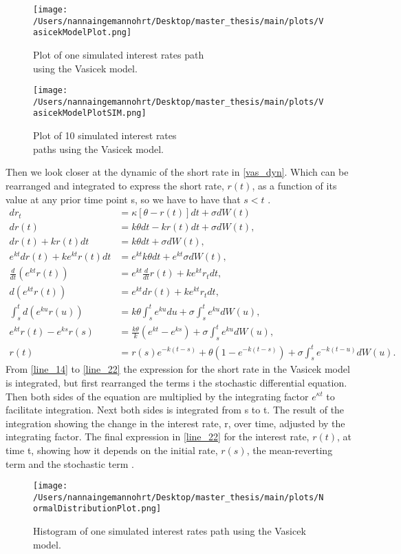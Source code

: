 \begin{figure}[h]
    \centering
    \begin{minipage}{0.5\textwidth}
        \texttt{[image: /Users/nannaingemannohrt/Desktop/master\_thesis/main/plots/VasicekModelPlot.png]}
        \caption{Plot of one simulated interest rates path \\ using the Vasicek model.}
        \label{fig:vasicek}
    \end{minipage}\hfill 
    \begin{minipage}{0.5\textwidth}
        \texttt{[image: /Users/nannaingemannohrt/Desktop/master\_thesis/main/plots/VasicekModelPlotSIM.png]}
        \caption{Plot of 10 simulated interest rates \\ paths using the Vasicek model.}
        \label{fig:vasicek-sim}
    \end{minipage}
\end{figure}

\noindent
\newpage
\noindent
Then we look closer at the dynamic of the short rate in \autoref{vas_dyn}. Which can be rearranged and integrated
to express the short rate, $r(t)$, as a function of its value at any prior time point s, 
so we have to have that $s < t$ \cite{Bermudan}. 
\begin{align}
    d r_t &= \kappa \left[\theta - r(t)\right] dt + \sigma d W(t) \label{line_14} \\
    d r(t) &= k \theta dt - k r(t) dt + \sigma d W(t),  \\
    d r(t) + k r(t) dt &= k \theta dt + \sigma d W(t), \\
    e^{kt} d r(t) + k e^{kt} r(t) dt &= e^{kt} k \theta dt + e^{kt} \sigma d W(t), \\
    \frac{d}{dt} \left( e^{k t} r(t) \right) &= e^{k t} \frac{d}{dt} r(t) + k e^{k t} r_t dt, \\
    d\left( e^{k t} r(t) \right) &= e^{k t} dr(t) + k e^{k t} r_t dt, \\
    \int_s^t d \left( e^{ku} r(u) \right) &= k \theta \int_s^t e^{ku} du + \sigma \int_s^t e^{ku} d W(u), \\
    e^{kt} r(t) - e^{k s} r(s) &= \frac{k \theta}{k} \left( e^{kt} - e^{ks} \right) + \sigma \int_s^t e^{ku} d W(u), \\
    r(t) &= r(s) e^{-k(t-s)} + \theta \left( 1 - e^{-k(t-s)} \right) + \sigma \int_s^t e^{-k(t-u)} d W(u). \label{line_22}
\end{align}
From \autoref{line_14} to \autoref{line_22} the expression for the short rate in the Vasicek model is integrated, but first
rearranged the terms i the stochastic differential equation. Then both sides of the equation are multiplied by the 
integrating factor $e^{\kappa t}$ to facilitate integration. Next both sides is integrated from s to t. The result of the
integration showing the change in the interest rate, r, over time, adjusted by the integrating factor. The final 
expression in \autoref{line_22} for the interest rate, $r(t)$, at time t, showing how it depends on the initial rate, $r(s)$,
the mean-reverting term and the stochastic term \cite{Bermudan}. 

\begin{figure}[h]
    \centering
    \texttt{[image: /Users/nannaingemannohrt/Desktop/master\_thesis/main/plots/NormalDistributionPlot.png]}
    \caption{Histogram of one simulated interest rates path using the Vasicek model.}
    \label{fig:rates:hist}
\end{figure}